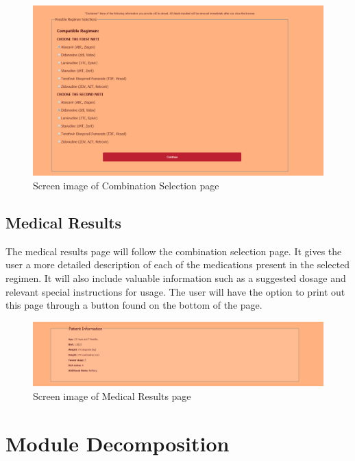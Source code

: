 \documentclass[12pt]{article}
\begin{document}
\begin{figure}[H]
  \centering
  \includegraphics[width=\linewidth]{combo.png}
  \caption{Screen image of Combination Selection page}
  \label{fig:combo}
\end{figure}

\subsection{Medical Results}
The medical results page will follow the combination selection page. It gives the user a more detailed description of each of the medications present in the selected regimen. It will also include valuable information such as a suggested dosage and relevant special instructions for usage. The user will have the option to print out this page through a button found on the bottom of the page.

\begin{figure}[H]
  \centering
  \includegraphics[width=\linewidth]{results1.png}
  \caption{Screen image of Medical Results page}
  \label{fig:results1}
\end{figure}

\section{Module Decomposition}
\end{document}
